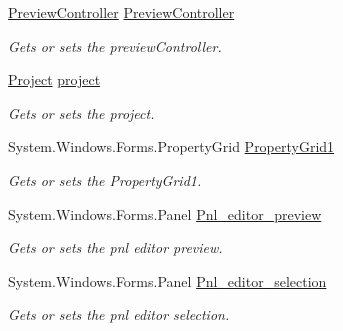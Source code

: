 \begin{DoxyCompactItemize}
\item 
\hyperlink{class_preview_controller}{Preview\-Controller} \hyperlink{class_a_rdev_kit_1_1_editor_window_ae57e383a1684241c86a5253d1fd8197a}{Preview\-Controller}
\begin{DoxyCompactList}\small\item\em Gets or sets the preview\-Controller. \end{DoxyCompactList}\item 
\hyperlink{class_a_rdev_kit_1_1_model_1_1_project_1_1_project}{Project} \hyperlink{class_a_rdev_kit_1_1_editor_window_aa7e64c912e3d904fae0ec52588be0baa}{project}
\begin{DoxyCompactList}\small\item\em Gets or sets the project. \end{DoxyCompactList}\item 
System.\-Windows.\-Forms.\-Property\-Grid \hyperlink{class_a_rdev_kit_1_1_editor_window_a8f5f7c03bcb123e147d07b5023a60292}{Property\-Grid1}
\begin{DoxyCompactList}\small\item\em Gets or sets the Property\-Grid1. \end{DoxyCompactList}\item 
System.\-Windows.\-Forms.\-Panel \hyperlink{class_a_rdev_kit_1_1_editor_window_a63d02d43b7dfe8841d6e1204948ecb17}{Pnl\-\_\-editor\-\_\-preview}
\begin{DoxyCompactList}\small\item\em Gets or sets the pnl editor preview. \end{DoxyCompactList}\item 
System.\-Windows.\-Forms.\-Panel \hyperlink{class_a_rdev_kit_1_1_editor_window_a601e295ca226828c6ca4eadc21101a78}{Pnl\-\_\-editor\-\_\-selection}
\begin{DoxyCompactList}\small\item\em Gets or sets the pnl editor selection. \end{DoxyCompactList}\item 

\end{DoxyCompactItemize}
